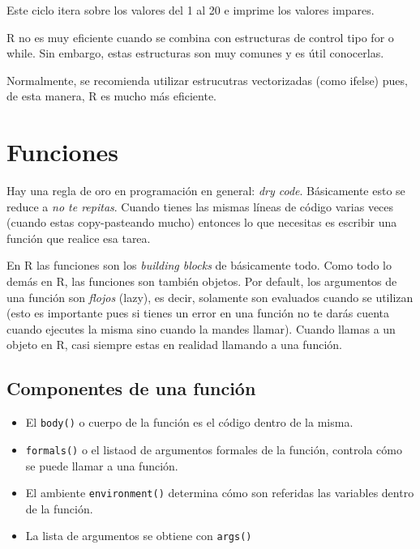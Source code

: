 \documentclass[]{article}
\newenvironment{Shaded}{\begin{snugshade}}{\end{snugshade}}
\newcommand{\KeywordTok}[1]{\textcolor[rgb]{0.13,0.29,0.53}{\textbf{{#1}}}}
\newcommand{\DecValTok}[1]{\textcolor[rgb]{0.00,0.00,0.81}{{#1}}}
\newcommand{\StringTok}[1]{\textcolor[rgb]{0.31,0.60,0.02}{{#1}}}
\newcommand{\NormalTok}[1]{{#1}}
\begin{document}
\begin{Shaded}
\end{Shaded}

Este ciclo itera sobre los valores del 1 al 20 e imprime los valores
impares.

\begin{nota}[Importante]
R no es muy eficiente cuando se combina con estructuras de control tipo for o 
while. Sin embargo, estas estructuras son muy comunes y es útil conocerlas. 

Normalmente, se recomienda utilizar estrucutras vectorizadas (como ifelse) pues,
de esta manera, R es mucho más eficiente. 
\end{nota}

\section{Funciones}\label{funciones}

Hay una regla de oro en programación en general: \emph{dry code}.
Básicamente esto se reduce a \emph{no te repitas}. Cuando tienes las
mismas líneas de código varias veces (cuando estas copy-pasteando mucho)
entonces lo que necesitas es escribir una función que realice esa tarea.

En R las funciones son los \emph{building blocks} de básicamente todo.
Como todo lo demás en R, las funciones son también objetos. Por default,
los argumentos de una función son \emph{flojos} (lazy), es decir,
solamente son evaluados cuando se utilizan (esto es importante pues si
tienes un error en una función no te darás cuenta cuando ejecutes la
misma sino cuando la mandes llamar). Cuando llamas a un objeto en R,
casi siempre estas en realidad llamando a una función.

\subsection{Componentes de una
función}\label{componentes-de-una-funcion}

\begin{itemize}
\itemsep1pt\parskip0pt
\item
  El \texttt{body()} o cuerpo de la función es el código dentro de la
  misma.
\item
  \texttt{formals()} o el listaod de argumentos formales de la función,
  controla cómo se puede llamar a una función.
\item
  El ambiente \texttt{environment()} determina cómo son referidas las
  variables dentro de la función.
\item
  La lista de argumentos se obtiene con \texttt{args()}
\end{itemize}
\end{document}
